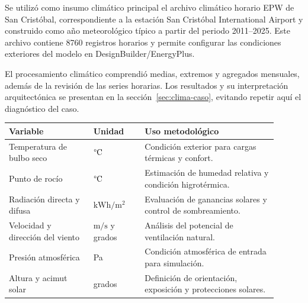 \noindent
\begin{minipage}[t]{\textwidth}
\vspace{0pt}
\rmfamily\fontsize{12}{18}\selectfont
Se utilizó como insumo climático principal el archivo climático horario EPW de San Cristóbal, correspondiente a la estación San Cristóbal International Airport y construido como año meteorológico típico a partir del periodo 2011--2025. Este archivo contiene 8760 registros horarios y permite configurar las condiciones exteriores del modelo en DesignBuilder/EnergyPlus.

El procesamiento climático comprendió medias, extremos y agregados mensuales, además de la revisión de las series horarias. Los resultados y su interpretación arquitectónica se presentan en la sección~\ref{sec:clima-caso}, evitando repetir aquí el diagnóstico del caso.
\end{minipage}\par\vspace{0.5cm}
\noindent\begin{minipage}[t]{\textwidth}
\vspace{0pt}
  {\fontsize{8.4}{10.2}\selectfont
  \begin{tabular}{p{0.29\linewidth}p{0.17\linewidth}p{0.44\linewidth}}
    \toprule
    Variable & Unidad & Uso metodológico \\
    \midrule
    Temperatura de bulbo seco & $\text{\textdegree C}$ & Condición exterior para cargas térmicas y confort. \\
    Punto de rocío & $\text{\textdegree C}$ & Estimación de humedad relativa y condición higrotérmica. \\
    Radiación directa y difusa & $\mathrm{kWh}/\mathrm{m}^{2}$ & Evaluación de ganancias solares y control de sombreamiento. \\
    Velocidad y dirección del viento & $\mathrm{m/s}$ y grados & Análisis del potencial de ventilación natural. \\
    Presión atmosférica & Pa & Condición atmosférica de entrada para simulación. \\
    Altura y acimut solar & grados & Definición de orientación, exposición y protecciones solares. \\
    \bottomrule
  \end{tabular}
  }
\end{minipage}

\par\medskip

